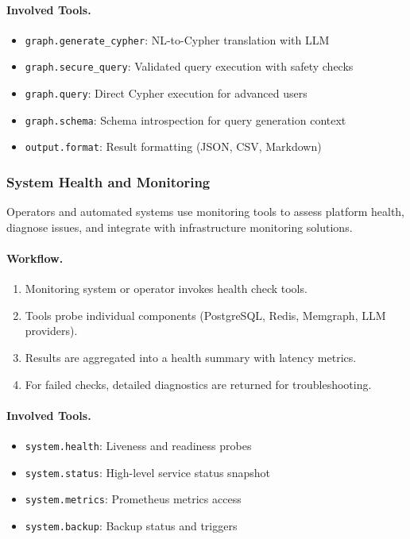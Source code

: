 \paragraph{Involved Tools.}
\begin{itemize}
    \item \texttt{graph.generate\_cypher}: NL-to-Cypher translation with LLM
    \item \texttt{graph.secure\_query}: Validated query execution with safety checks
    \item \texttt{graph.query}: Direct Cypher execution for advanced users
    \item \texttt{graph.schema}: Schema introspection for query generation context
    \item \texttt{output.format}: Result formatting (JSON, CSV, Markdown)
\end{itemize}

\subsubsection{System Health and Monitoring}

Operators and automated systems use monitoring tools to assess platform health, diagnose issues, and integrate with infrastructure monitoring solutions.

\paragraph{Workflow.}
\begin{enumerate}
    \item Monitoring system or operator invokes health check tools.
    \item Tools probe individual components (PostgreSQL, Redis, Memgraph, LLM providers).
    \item Results are aggregated into a health summary with latency metrics.
    \item For failed checks, detailed diagnostics are returned for troubleshooting.
\end{enumerate}

\paragraph{Involved Tools.}
\begin{itemize}
    \item \texttt{system.health}: Liveness and readiness probes
    \item \texttt{system.status}: High-level service status snapshot
    \item \texttt{system.metrics}: Prometheus metrics access
    \item \texttt{system.backup}: Backup status and triggers
\end{itemize}

